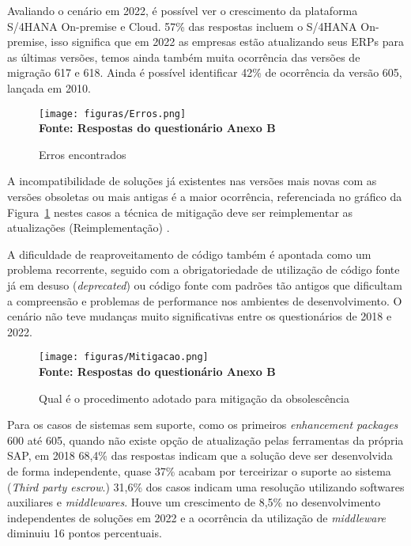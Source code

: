 Avaliando o cenário em 2022, é possível ver o crescimento da plataforma S/4HANA On-premise e Cloud.
57\% das respostas incluem o S/4HANA On-premise, isso significa que em 2022 as empresas estão atualizando seus ERPs para as últimas versões, temos ainda também muita ocorrência das versões de migração 617 e 618. 
Ainda é possível identificar 42\% de ocorrência da versão 605, lançada em 2010.
\newpage
\begin{figure}[ht]
	\centering	
	\caption[\hspace{0.1cm}Q1.]{Erros encontrados}
	\vspace{-0.4cm}
	\texttt{[image: figuras/Erros.png]}
	\vspace{-0.2cm}
	\\\textbf{\footnotesize Fonte: Respostas do questionário Anexo B }	
	\label{fig:pergunta-erro}
\end{figure}

A incompatibilidade de soluções já existentes nas versões mais novas com as versões obsoletas ou mais antigas é a maior ocorrência, referenciada no gráfico da Figura~\ref{fig:pergunta-erro} nestes casos a técnica de mitigação deve ser reimplementar as atualizações (Reimplementação) \cite{sandborn2007}.

A dificuldade de reaproveitamento de código também é apontada como um problema recorrente, seguido com a obrigatoriedade de utilização de código fonte já em desuso (\textit{deprecated}) ou código fonte com padrões tão antigos que dificultam a compreensão e problemas de performance nos ambientes de desenvolvimento. O cenário não teve mudanças muito significativas entre os questionários de 2018 e 2022.

\begin{figure}[ht]
	\centering	
	\caption[\hspace{0.1cm}Q1.]{Qual é o procedimento adotado para mitigação da obsolescência}
	\vspace{-0.4cm}
	\texttt{[image: figuras/Mitigacao.png]}
	\vspace{-0.2cm}
	\\\textbf{\footnotesize Fonte: Respostas do questionário Anexo B }	
	\label{fig:org_lid}
\end{figure}

\vspace{-0.5cm}
Para os casos de sistemas sem suporte, como os primeiros \textit{enhancement packages} 600 até 605, quando não existe opção de atualização pelas ferramentas da própria SAP, em 2018 68,4\% das respostas indicam que a solução deve ser desenvolvida de forma independente, quase 37\% acabam por terceirizar o suporte ao sistema (\textit{Third party escrow}.) 31,6\% dos casos indicam uma resolução utilizando softwares auxiliares e \textit{middlewares}.
Houve um crescimento de 8,5\% no desenvolvimento independentes de soluções em 2022 e a ocorrência da utilização de \textit{middleware} diminuiu 16 pontos percentuais.

